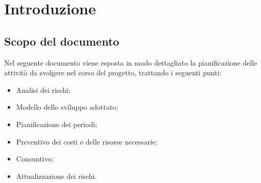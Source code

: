 \section{Introduzione}

\subsection{Scopo del documento}
Nel seguente documento viene esposta in modo dettagliato la pianificazione delle attività da svolgere nel corso del progetto, trattando i seguenti punti:
\begin{itemize}
	\item Analisi dei rischi;
	\item Modello dello sviluppo adottato;
	\item Pianificazione dei periodi;
	\item Preventivo dei costi e delle risorse necessarie;
	\item Consuntivo;
	\item Attualizzazione dei rischi.
\end{itemize}

